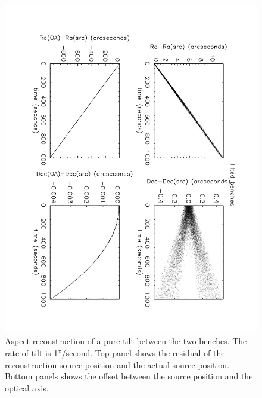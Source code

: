 \begin{figure}[htbp] %
   \centering
   \includegraphics[width=14cm, angle=180]{images/test6.pdf} 
   \caption{\footnotesize{Aspect reconstruction of a pure tilt between the two benches. The rate of tilt is 1''/second. Top panel shows the residual of the reconstruction source position and the actual source position. Bottom panels shows the offset between the source position and the optical axis.}}
   \label{test6}
\end{figure}

